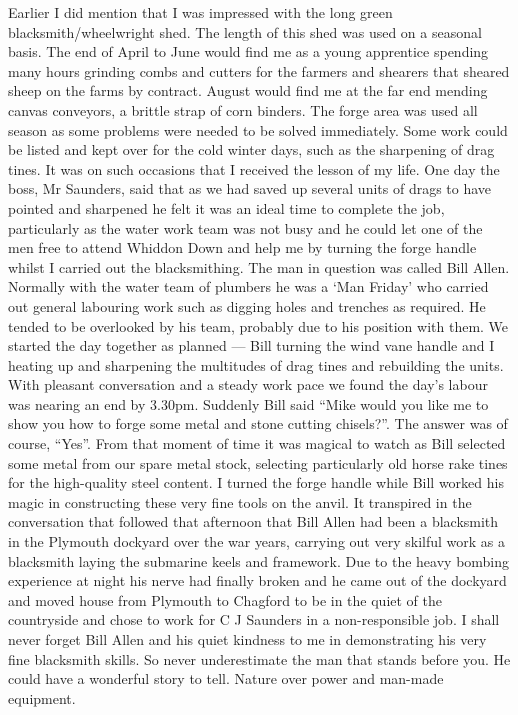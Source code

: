 
Earlier I did mention that I was impressed with the long green
blacksmith/wheelwright shed. The length of this shed was used on a seasonal
basis. The end of April to June would find me as a young apprentice spending
many hours grinding combs and cutters for the farmers and shearers that sheared
sheep on the farms by contract. August would find me at the far end mending
canvas conveyors, a brittle strap of corn binders. The forge area was used all
season as some problems were needed to be solved immediately. Some work could
be listed and kept over for the cold winter days, such as the sharpening of
drag tines. It was on such occasions that I received the lesson of my life. One
day the boss, Mr Saunders, said that as we had saved up several units of drags
to have pointed and sharpened he felt it was an ideal time to complete the job,
particularly as the water work team was not busy and he could let one of the
men free to attend Whiddon Down and help me by turning the forge handle whilst
I carried out the blacksmithing. The man in question was called Bill Allen.
Normally with the water team of plumbers he was a `Man Friday' who carried out
general labouring work such as digging holes and trenches as required. He
tended to be overlooked by his team, probably due to his position with them. We
started the day together as planned --- Bill turning the wind vane handle and I
heating up and sharpening the multitudes of drag tines and rebuilding the
units. With pleasant conversation and a steady work pace we found the day's
labour was nearing an end by 3.30pm. Suddenly Bill said ``Mike would you like
me to show you how to forge some metal and stone cutting chisels?''. The answer
was of course, ``Yes''. From that moment of time it was magical to watch as
Bill selected some metal from our spare metal stock, selecting particularly old
horse rake tines for the high-quality steel content. I turned the forge handle
while Bill worked his magic in constructing these very fine tools on the anvil.
It transpired in the conversation that followed that afternoon that Bill Allen
had been a blacksmith in the Plymouth dockyard over the war years, carrying out
very skilful work as a blacksmith laying the submarine keels and framework. Due
to the heavy bombing experience at night his nerve had finally broken and he
came out of the dockyard and moved house from Plymouth to Chagford to be in the
quiet of the countryside and chose to work for C J Saunders in a
non-responsible job. I shall never forget Bill Allen and his quiet kindness to
me in demonstrating his very fine blacksmith skills. So never underestimate the
man that stands before you. He could have a wonderful story to tell. Nature
over power and man-made equipment.

